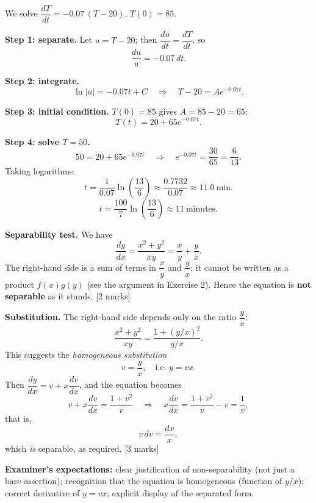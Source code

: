 \documentclass[11pt]{article}
\begin{document}
\begin{corrige}
We solve $\dfrac{dT}{dt}=-0.07\,(T-20)$, $T(0)=85$.

\textbf{Step 1: separate.} Let $u=T-20$; then $\dfrac{du}{dt}=\dfrac{dT}{dt}$, so
\[
\frac{du}{u}=-0.07\,dt.
\]

\textbf{Step 2: integrate.}
\[
\ln|u|=-0.07t+C \quad\Longrightarrow\quad T-20=Ae^{-0.07t}.
\]

\textbf{Step 3: initial condition.} $T(0)=85$ gives $A=85-20=65$:
\[
T(t)=20+65e^{-0.07t}.
\]

\textbf{Step 4: solve $T=50$.}
\[
50=20+65e^{-0.07t}
\quad\Longrightarrow\quad
e^{-0.07t}=\frac{30}{65}=\frac{6}{13}.
\]
Taking logarithms:
\[
t=\frac{1}{0.07}\ln\!\left(\frac{13}{6}\right)\approx \frac{0.7732}{0.07}\approx 11.0\ \text{min}.
\]
\[
\boxed{\,t=\dfrac{100}{7}\ln\!\left(\dfrac{13}{6}\right)\approx 11\ \text{minutes}.\,}
\]
\end{corrige}

\begin{corrige}
\textbf{Separability test.} We have
\[
\frac{dy}{dx}=\frac{x^{2}+y^{2}}{xy}=\frac{x}{y}+\frac{y}{x}.
\]
The right-hand side is a sum of terms in $\dfrac{x}{y}$ and $\dfrac{y}{x}$; it cannot be written as a product $f(x)g(y)$ (see the argument in Exercise 2). Hence the equation is \textbf{not separable} as it stands. \hfill[2 marks]

\textbf{Substitution.} The right-hand side depends only on the ratio $\dfrac{y}{x}$:
\[
\frac{x^{2}+y^{2}}{xy}=\frac{1+(y/x)^{2}}{y/x}.
\]
This suggests the \emph{homogeneous substitution}
\[
\boxed{\;v=\frac{y}{x},\quad\text{i.e. } y=vx.\;}
\]
Then $\dfrac{dy}{dx}=v+x\dfrac{dv}{dx}$, and the equation becomes
\[
v+x\frac{dv}{dx}=\frac{1+v^{2}}{v}
\quad\Longrightarrow\quad
x\frac{dv}{dx}=\frac{1+v^{2}}{v}-v=\frac{1}{v},
\]
that is,
\[
v\,dv=\frac{dx}{x},
\]
which \emph{is} separable, as required. \hfill[3 marks]

\textbf{Examiner's expectations:} clear justification of non-separability (not just a bare assertion); recognition that the equation is homogeneous (function of $y/x$); correct derivative of $y=vx$; explicit display of the separated form.
\end{corrige}
\end{document}
